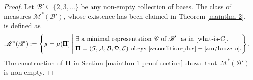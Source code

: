 \documentclass[12pt, twoside]{article}
\theoremstyle{definition}
\numberwithin{equation}{section}
\begin{document}
\begin{proof}
Let $\mathscr{B}' \subseteq \{2, 3, \ldots\}$ be any non-empty collection of bases. The class of measures $\mathscr{M}^{\ast}(\mathscr{B}')$, whose existence has been claimed  in Theorem \ref{mainthm-2}, is defined as 
\begin{equation} 
\mathscr{M}^{\ast}(\mathscr{B}') : =\left\{ \mu = \mu(\pmb{\Pi}) \; \Biggl| \; \begin{aligned} &\exists \text{ a minimal representation } \mathscr{C} \text{ of $\mathscr{B}'$ } \text{ as in } \eqref{what-is-C}, \\
&\pmb{\Pi} = (\mathcal S, \mathcal A, \mathcal B, \mathcal D, \mathcal E) \text{ obeys } \eqref{s-condition-plus}-\eqref{am/bmzero}. 
\end{aligned}\right\}.
\end{equation} 
The construction of $\pmb{\Pi}$ in Section \ref{mainthm-1-proof-section} shows that $\mathscr{M}^{\ast}(\mathscr{B}')$ is non-empty. 


\end{proof}
\end{document}
